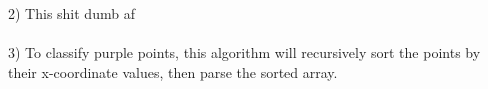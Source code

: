 \documentclass[12pt]{article}
\begin{document}
\pagebreak


2) This shit dumb af\\ \\ 

3) To classify purple points, this algorithm will recursively sort the points by their x-coordinate values, then parse the sorted array.\\





\end{document}
